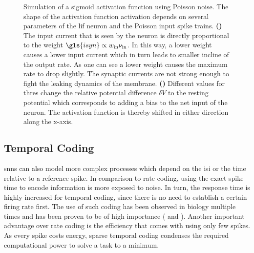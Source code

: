 \begin{figure}
	\begin{subfigure}[c]{0.5\textwidth}
		\centering
		\caption{}
		
		\label{theoreticalactivationfunctionweight}
	\end{subfigure}	
	\begin{subfigure}[c]{0.5\textwidth}
		\centering
		\caption{}
		
		\label{theoreticalactivationfunctionbias}
	\end{subfigure}
	\caption[Simulation of a sigmoid activation function using Poisson noise]{Simulation of a sigmoid activation function using Poisson noise. The shape of the activation function \gls{activation} depends on several parameters of the \gls{lif} neuron and the Poisson input  spike trains. \textbf{()} The input current that is seen by the neuron is directly proportional to the weight $\gls{isyn} \propto w_\text{in} \nu_\text{in}$. In this way, a lower weight causes a lower input current which in turn leads to smaller incline of the output rate. As one can see a lower weight causes the maximum rate to drop slightly. The synaptic currents are not strong enough to fight the leaking dynamics of the membrane. \textbf{()} Different values for \gls{thres} change the relative potential difference $\delta V$ to the resting potential which corresponds to adding a bias to the net input of the neuron. The activation function is thereby shifted in either direction along the x-axis.}
	\label{theoreticalactivationfunction}
\end{figure}

\pagebreak
\subsection{Temporal Coding}
\glspl{snn} can also model more complex processes which depend on the \gls{isi} or the time relative to a reference spike. In comparison to rate coding, using the exact spike time to encode information is more exposed to noise. In turn, the response time is highly increased for temporal coding, since there is no need to establish a certain firing rate first. The use of such coding has been observed in biology multiple times and has been proven to be of high importance (\citealp{gerstner1996neuronal} and \citealp{rieke1999spikes}). Another important advantage over rate coding is the efficiency that comes with using only few spikes. As every spike costs energy, sparse temporal coding condenses the required computational power to solve a task to a minimum. 

